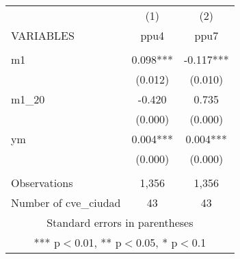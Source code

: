 \begin{tabular}{lcc} \hline
 & (1) & (2) \\
VARIABLES & ppu4 & ppu7 \\ \hline
 &  &  \\
m1 & 0.098*** & -0.117*** \\
 & (0.012) & (0.010) \\
m1\_20 & -0.420 & 0.735 \\
 & (0.000) & (0.000) \\
ym & 0.004*** & 0.004*** \\
 & (0.000) & (0.000) \\
 &  &  \\
Observations & 1,356 & 1,356 \\
 Number of cve\_ciudad & 43 & 43 \\ \hline
\multicolumn{3}{c}{ Standard errors in parentheses} \\
\multicolumn{3}{c}{ *** p$<$0.01, ** p$<$0.05, * p$<$0.1} \\
\end{tabular}
